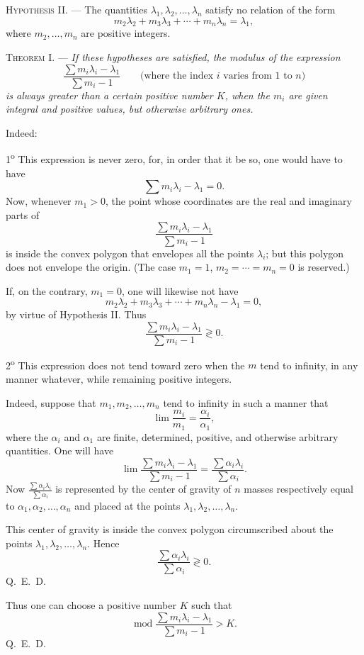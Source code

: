 \documentclass[11pt]{article}
\begin{document}
\noindent\textsc{Hypothesis II.} --- The quantities $\lambda_1,\lambda_2,\ldots,\lambda_n$ satisfy no relation of the form
\[
m_2\lambda_2+m_3\lambda_3+\cdots+m_n\lambda_n=\lambda_1,
\]
where $m_2,\ldots,m_n$ are positive integers.

\noindent\textsc{Theorem I.} --- \emph{If these hypotheses are satisfied, the modulus of the expression}
\[
\frac{\sum m_i\lambda_i-\lambda_1}{\sum m_i-1}
\qquad\text{(where the index $i$ varies from $1$ to $n$)}
\]
\emph{is always greater than a certain positive number $K$, when the $m_i$ are given integral and positive values, but otherwise arbitrary ones.}

Indeed:

1\textsuperscript{o} This expression is never zero, for, in order that it be so, one would have to have
\[
\sum m_i\lambda_i-\lambda_1=0.
\]
Now, whenever $m_1>0$, the point whose coordinates are the real and imaginary parts of
\[
\frac{\sum m_i\lambda_i-\lambda_1}{\sum m_i-1}
\]
is inside the convex polygon that envelopes all the points $\lambda_i$; but this polygon does not envelope the origin. (The case $m_1=1$, $m_2=\cdots=m_n=0$ is reserved.)

If, on the contrary, $m_1=0$, one will likewise not have
\[
m_2\lambda_2+m_3\lambda_3+\cdots+m_n\lambda_n-\lambda_1=0,
\]
by virtue of Hypothesis II. Thus
\[
\frac{\sum m_i\lambda_i-\lambda_1}{\sum m_i-1} \gtrless 0.
\]

2\textsuperscript{o} This expression does not tend toward zero when the $m$ tend to infinity, in any manner whatever, while remaining positive integers.

Indeed, suppose that $m_1,m_2,\ldots,m_n$ tend to infinity in such a manner that
\[
\lim\frac{m_i}{m_1}=\frac{\alpha_i}{\alpha_1},
\]
where the $\alpha_i$ and $\alpha_1$ are finite, determined, positive, and otherwise arbitrary quantities. One will have
\[
\lim\frac{\sum m_i\lambda_i-\lambda_1}{\sum m_i-1}
=
\frac{\sum \alpha_i\lambda_i}{\sum \alpha_i}.
\]
Now $\frac{\sum \alpha_i\lambda_i}{\sum \alpha_i}$ is represented by the center of gravity of $n$ masses respectively equal to $\alpha_1,\alpha_2,\ldots,\alpha_n$ and placed at the points $\lambda_1,\lambda_2,\ldots,\lambda_n$.

This center of gravity is inside the convex polygon circumscribed about the points $\lambda_1,\lambda_2,\ldots,\lambda_n$. Hence
\[
\frac{\sum \alpha_i\lambda_i}{\sum \alpha_i} \gtrless 0.
\]
\hfill\mbox{Q. E. D.}

Thus one can choose a positive number $K$ such that
\[
\operatorname{mod}\frac{\sum m_i\lambda_i-\lambda_1}{\sum m_i-1}>K.
\]
\hfill\mbox{Q. E. D.}
\end{document}
